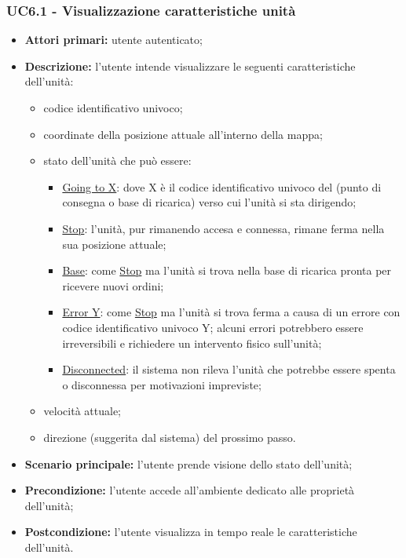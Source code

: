         \subsubsection{UC6.1 - Visualizzazione caratteristiche unità}
        \begin{itemize}
            \item \textbf{Attori primari:} utente autenticato;
            \item \textbf{Descrizione:} l'utente intende visualizzare le seguenti caratteristiche dell'unità:
            \begin{itemize}
                \item codice identificativo univoco;
                \item coordinate della posizione attuale all'interno della mappa;
                \item stato dell'unità che può essere:
                \begin{itemize}
                    \item \underline{Going to X}: dove X è il codice identificativo univoco del  (punto di consegna o base di ricarica) verso cui l'unità si sta dirigendo;
                    \item \underline{Stop}: l'unità, pur rimanendo accesa e connessa, rimane ferma nella sua posizione attuale;
                    \item \underline{Base}: come \underline{Stop} ma l'unità si trova nella base di ricarica pronta per ricevere nuovi ordini;
                    \item \underline{Error Y}: come \underline{Stop} ma l'unità si trova ferma a causa di un errore con codice identificativo univoco Y; alcuni errori potrebbero essere irreversibili e richiedere un intervento fisico sull'unità;
                    \item \underline{Disconnected}: il sistema non rileva l'unità che potrebbe essere spenta o disconnessa per motivazioni impreviste;
                \end{itemize}
                \item velocità attuale;
                \item direzione (suggerita dal sistema) del prossimo passo.
            \end{itemize}
            \item \textbf{Scenario principale:} l'utente prende visione dello stato dell'unità;
            \item \textbf{Precondizione:} l'utente accede all'ambiente dedicato alle proprietà dell'unità;
            \item \textbf{Postcondizione:} l'utente visualizza in tempo reale le caratteristiche dell'unità.
        \end{itemize}

